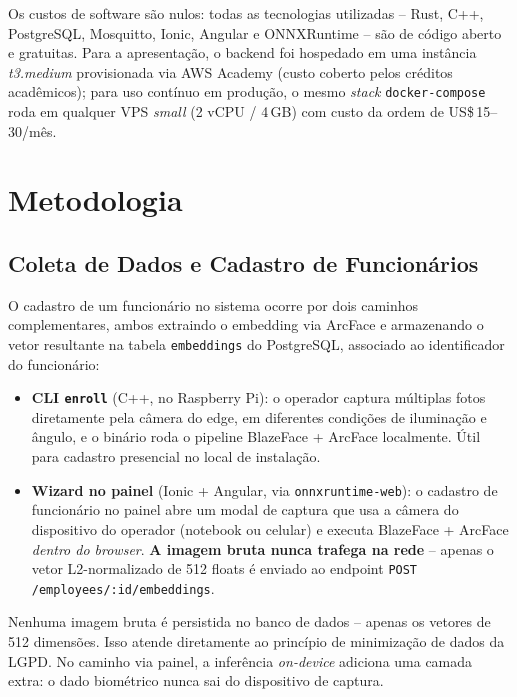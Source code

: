 \documentclass[12pt,a4paper]{report}
\begin{document}
Os custos de software são nulos: todas as tecnologias utilizadas -- Rust, C++, PostgreSQL, Mosquitto, Ionic, Angular e ONNXRuntime -- são de código aberto e gratuitas. Para a apresentação, o backend foi hospedado em uma instância \textit{t3.medium} provisionada via AWS Academy (custo coberto pelos créditos acadêmicos); para uso contínuo em produção, o mesmo \textit{stack} \texttt{docker-compose} roda em qualquer VPS \textit{small} (2 vCPU / 4\,GB) com custo da ordem de US\$\,15--30/mês.

\chapter{Metodologia}

\section{Coleta de Dados e Cadastro de Funcionários}

O cadastro de um funcionário no sistema ocorre por dois caminhos complementares, ambos extraindo o embedding via ArcFace e armazenando o vetor resultante na tabela \texttt{embeddings} do PostgreSQL, associado ao identificador do funcionário:

\begin{itemize}
    \item \textbf{CLI \texttt{enroll}} (C++, no Raspberry Pi): o operador captura múltiplas fotos diretamente pela câmera do edge, em diferentes condições de iluminação e ângulo, e o binário roda o pipeline BlazeFace + ArcFace localmente. Útil para cadastro presencial no local de instalação.
    \item \textbf{Wizard no painel} (Ionic + Angular, via \texttt{onnxruntime-web}): o cadastro de funcionário no painel abre um modal de captura que usa a câmera do dispositivo do operador (notebook ou celular) e executa BlazeFace + ArcFace \emph{dentro do browser}. \textbf{A imagem bruta nunca trafega na rede} -- apenas o vetor L2-normalizado de 512 floats é enviado ao endpoint \texttt{POST /employees/:id/embeddings}.
\end{itemize}

Nenhuma imagem bruta é persistida no banco de dados -- apenas os vetores de 512 dimensões. Isso atende diretamente ao princípio de minimização de dados da LGPD. No caminho via painel, a inferência \textit{on-device} adiciona uma camada extra: o dado biométrico nunca sai do dispositivo de captura.
\end{document}
